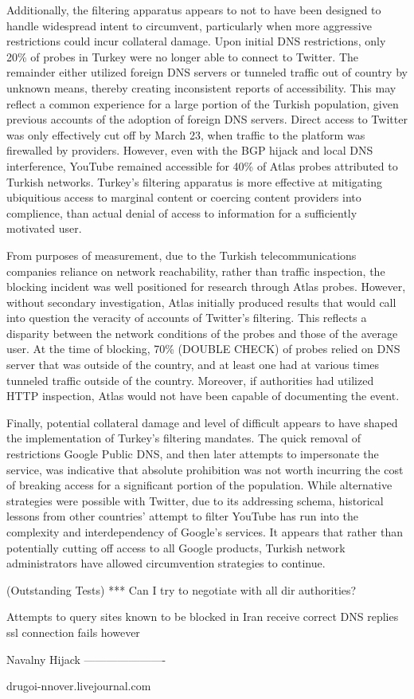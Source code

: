 Additionally, the filtering apparatus appears to not to have been designed to handle widespread intent to circumvent, particularly when more aggressive restrictions could incur collateral damage. Upon initial DNS restrictions, only 20\% of probes in Turkey were no longer able to connect to Twitter. The remainder either utilized foreign DNS servers or tunneled traffic out of country by unknown means, thereby creating inconsistent reports of accessibility. This may reflect a common experience for a large portion of the Turkish population, given previous accounts of the adoption of foreign DNS servers. Direct access to Twitter was only effectively cut off by March 23, when traffic to the platform was firewalled by providers. However, even with the BGP hijack and local DNS interference, YouTube remained accessible for 40\% of Atlas probes attributed to Turkish networks. Turkey's filtering apparatus is more effective at mitigating ubiquitious access to marginal content or coercing content providers into complience, than actual denial of access to information for a sufficiently motivated user.

From purposes of measurement, due to the Turkish telecommunications companies reliance on network reachability, rather than traffic inspection, the blocking incident was well positioned for research through Atlas probes. However, without secondary investigation, Atlas initially produced results that would call into question the veracity of accounts of Twitter's filtering. This reflects a disparity between the network conditions of the probes and those of the average user. At the time of blocking, 70\% (DOUBLE CHECK) of probes relied on DNS server that was outside of the country, and at least one had at various times tunneled traffic outside of the country. Moreover, if authorities had utilized HTTP inspection, Atlas would not have been capable of documenting the event.

Finally, potential collateral damage and level of difficult appears to have shaped the implementation of Turkey's filtering mandates. The quick removal of restrictions Google Public DNS, and then later attempts to impersonate the service, was indicative that absolute prohibition was not worth incurring the cost of breaking access for a significant portion of the population. While alternative strategies were possible with Twitter, due to its addressing schema, historical lessons from other countries' attempt to filter YouTube has run into the complexity and interdependency of Google's services. It appears that rather than potentially cutting off access to all Google products, Turkish network administrators have allowed circumvention strategies to continue.

(Outstanding Tests)
*** Can I try to negotiate with all dir authorities?


Attempts to query sites known to be blocked in Iran receive correct DNS replies
ssl connection fails however




Navalny Hijack
----------------------

drugoi-nnover.livejournal.com	

